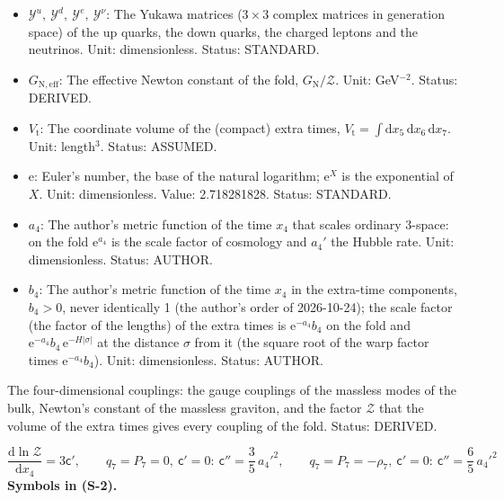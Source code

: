 \documentclass[
  10pt,
]{article}
\begin{document}
\begin{itemize}
  Unit: dimensionless. Status: DERIVED.
\item
  \(\mathcal{Y}^{u},\ \mathcal{Y}^{d},\ \mathcal{Y}^{e},\ \mathcal{Y}^{\nu}\):
  The Yukawa matrices (\(3 \times 3\) complex matrices in generation
  space) of the up quarks, the down quarks, the charged leptons and the
  neutrinos. Unit: dimensionless. Status: STANDARD.
\item
  \(G_{\mathrm{N,eff}}\): The effective Newton constant of the fold,
  \(G_{\mathrm{N}}/\mathcal{Z}\). Unit: GeV\(^{-2}\). Status: DERIVED.
\item
  \(V_{\mathrm{t}}\): The coordinate volume of the (compact) extra
  times,
  \(V_{\mathrm{t}} = \int\mathrm{d}x_5\,\mathrm{d}x_6\,\mathrm{d}x_7\).
  Unit: length\(^3\). Status: ASSUMED.
\item
  \(\mathrm{e}\): Euler's number, the base of the natural logarithm;
  \(\mathrm{e}^{X}\) is the exponential of \(X\). Unit: dimensionless.
  Value: 2.718281828. Status: STANDARD.
\item
  \(a_4\): The author's metric function of the time \(x_4\) that scales
  ordinary 3-space: on the fold \(\mathrm{e}^{a_4}\) is the scale factor
  of cosmology and \(a_4'\) the Hubble rate. Unit: dimensionless.
  Status: AUTHOR.
\item
  \(b_4\): The author's metric function of the time \(x_4\) in the
  extra-time components, \(b_4 > 0\), never identically 1 (the author's
  order of 2026-10-24); the scale factor (the factor of the lengths) of
  the extra times is \(\mathrm{e}^{-a_4}b_4\) on the fold and
  \(\mathrm{e}^{-a_4}b_4\,\mathrm{e}^{-H\lvert\sigma\rvert}\) at the
  distance \(\sigma\) from it (the square root of the warp factor times
  \(\mathrm{e}^{-a_4}b_4\)). Unit: dimensionless. Status: AUTHOR.
\end{itemize}

The four-dimensional couplings: the gauge couplings of the massless
modes of the bulk, Newton's constant of the massless graviton, and the
factor \(\mathcal{Z}\) that the volume of the extra times gives every
coupling of the fold. Status: DERIVED.

\[
\frac{\mathrm{d}\ln\mathcal{Z}}{\mathrm{d}x_4} = 3\mathsf{c}',\qquad
q_7 = P_7 = 0,\ \mathsf{c}' = 0:\ \mathsf{c}'' = \frac35\,a_4'^2,\qquad q_7 = P_7 = -\rho_7,\ \mathsf{c}' = 0:\ \mathsf{c}'' = \frac65\,a_4'^2 \tag{S-2}
\] \textbf{Symbols in (S-2).}
\end{document}
